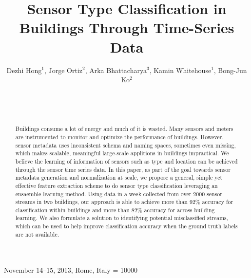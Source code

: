 \documentclass{sig-alternate}
\begin{document}
 {November 14--15, 2013, Rome, Italy} 
\widowpenalty = 10000

\title{Sensor Type Classification in Buildings Through Time-Series Data
}
\author{
\alignauthor
Dezhi Hong$^1$, Jorge Ortiz$^2$, Arka Bhattacharya$^3$, Kamin Whitehouse$^1$, Bong-Jun Ko$^2$\\
	\\
	\\
	\\
}

\maketitle
\begin{abstract}
Buildings consume a lot of energy and much of it is wasted. Many sensors and meters are instrumented to monitor and optimize the performance of buildings. 
However, sensor metadata uses inconsistent schema and naming spaces, sometimes even missing, which makes scalable, meaningful large-scale applitions in 
buildings impractical. We believe the learning of information of sensors such as type and location can be achieved through the sensor time series data. 
In this paper, as part of the goal towards sensor metadata generation and normalization at scale, we propose a general, simple yet effective feature extraction 
scheme to do sensor type classification leveraging an ensaemble learning method. Using data in a week collected from over 2000 sensor streams in two buildings, 
our approach is able to achieve more than 92\% accuracy for classification within buildings and more than 82\% accuracy for across building learning. We also 
formulate a solution to identifying potential misclassified streams, which can be used to help improve classification accuracy when the ground truth labels 
are not available.
\end{abstract}

\end{document}
